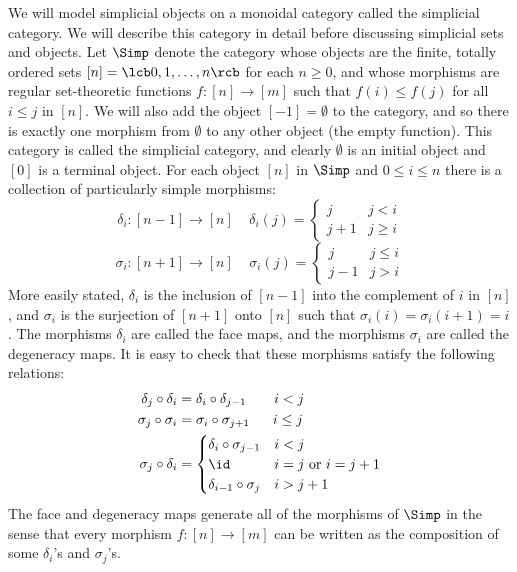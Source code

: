 We will model simplicial objects on a monoidal category called the simplicial category. We will describe this category in detail before discussing simplicial sets and objects. Let $\Simp$ denote the category whose objects are the finite, totally ordered sets $[n] = \lcb 0,1,\ldots,n \rcb$ for each $n \geq 0$, and whose morphisms are regular set-theoretic functions $f : [n] \rightarrow [m]$ such that $f(i) \leq f(j)$ for all $i \leq j$ in $[n]$. We will also add the object $[-1]=\emptyset$ to the category, and so there is exactly one morphism from $\emptyset$ to any other object (the empty function). This category is called the simplicial category, and clearly $\emptyset$ is an initial object and $[0]$ is a terminal object. For each object $[n]$ in $\Simp$ and $0 \leq i \leq n$ there is a collection of particularly simple morphisms:
\[ \delta_i : [n-1] \rightarrow [n] \ \ \ \ \ \delta_i(j) = \begin{cases} j & j < i \\ j+1 & j \geq i \end{cases} \]
\[ \sigma_i : [n+1] \rightarrow [n] \ \ \ \ \ \sigma_i(j) = \begin{cases} j & j \leq i \\ j-1 & j > i \end{cases} \]
More easily stated, $\delta_i$ is the inclusion of $[n-1]$ into the complement of $i$ in $[n]$, and $\sigma_i$ is the surjection of $[n+1]$ onto $[n]$ such that $\sigma_i(i) = \sigma_i(i+1) = i$. The morphisms $\delta_i$ are called the face maps, and the morphisms $\sigma_i$ are called the degeneracy maps. It is easy to check that these morphisms satisfy the following relations:
\begin{align*}
	\delta_j \circ \delta_i &= \delta_i \circ \delta_{j-1} \ \ \ \ \ \ i<j \\
	\sigma_j \circ \sigma_i &= \sigma_i \circ \sigma_{j+1} \ \ \ \ \ i \leq j	 \\
	\sigma_j \circ \delta_i &= \begin{cases} 
															 \delta_i \circ \sigma_{j-1} & i < j \\ 
															 \id & i=j \text{ or } i = j+1 \\ 
															 \delta_{i-1} \circ \sigma_j & i > j+1 
														 \end{cases}
\end{align*}
The face and degeneracy maps generate all of the morphisms of $\Simp$ in the sense that every morphism $f : [n] \rightarrow [m]$ can be written as the composition of some $\delta_i$'s and $\sigma_j$'s. 

